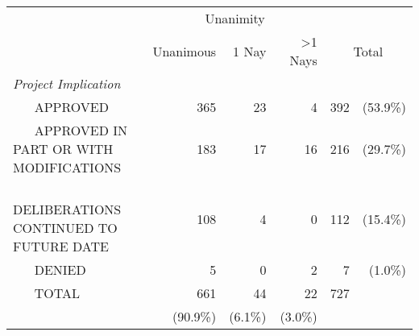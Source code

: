 \begin{tabular}{lrrrrr} \toprule
 & \multicolumn{3}{c}{Unanimity} &  & \\ \cline{2-4} 
 & Unanimous & 1 Nay & >1 Nays & \multicolumn{2}{c}{Total} \\ \midrule
\textit{Project Implication} & & & & & \\ 
~ ~ APPROVED & 365 & 23 & 4 & 392 & (53.9\%) \\ [1ex] 
~ ~ APPROVED IN PART OR WITH MODIFICATIONS & 183 & 17 & 16 & 216 & (29.7\%) \\ [1ex] 
~ ~ DELIBERATIONS CONTINUED TO FUTURE DATE & 108 & 4 & 0 & 112 & (15.4\%) \\ [1ex] 
~ ~ DENIED & 5 & 0 & 2 & 7 & (1.0\%) \\ [1ex] 
~ ~ TOTAL & 661 & 44 & 22 & 727 &  \\ [1ex] 
 & (90.9\%) & (6.1\%) & (3.0\%) &  &  \\ [1ex] 
\end{tabular}
